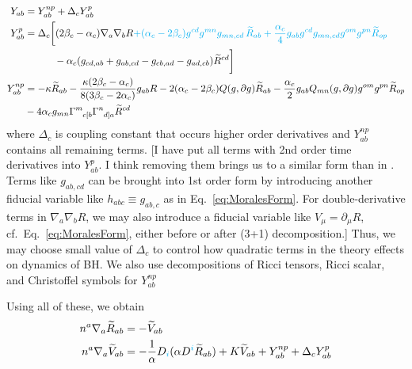 \documentclass[a4paper,oneside,openany,11pt]{memoir}
\numberwithin{equation}{section} %
\newcommand{\aaron}[1]{{\color{cyan} #1}}
\newcommand{\TODO}[1]{{\color{red}[}{\color{red}TODO:} {\color{blue}#1}{\color{red}]}}
\begin{document}
\begin{align}
Y_{ab} &= Y^{np}_{ab} + \Delta_c Y^{p}_{ab}
\\\notag
Y^{p}_{ab} &= \Delta_c \bigg[
	(2 \beta_c - \alpha_c) \nabla_a \nabla_b R
	\aaron{
	+ (\alpha_c - 2 \beta_c)g^{cd}g^{mn} g_{mn,cd}\,\widetilde{R}_{ab}
	+\frac{\alpha_c}{4} g_{ab} g^{cd}g_{mn,cd} g^{om}g^{pn} \widetilde{R}_{op}
	}
	\\\notag
	&\quad\quad\quad
	- \alpha_c (g_{cd,ab} + g_{ab,cd} - g_{cb,ad} - g_{ad,cb}) \widetilde{R}^{cd} 
	\bigg]
\\\notag
Y^{np}_{ab} &= 
- \kappa \widetilde{R}_{ab} - \frac{\kappa(2 \beta_c - \alpha_c)}{8(3\beta_c - 2 \alpha_c)} g_{ab} R
-2(\alpha_c - 2 \beta_c)Q(g,\partial g)\widetilde{R}_{ab}
-\frac{\alpha_c}{2} g_{ab} Q_{mn} (g,\partial g) g^{om}g^{pn} \widetilde{R}_{op}
\\\notag
&- 4\alpha_c g_{mn} \Gamma\indices{^m_{c[b}} \Gamma\indices{^n_{d]a}} \widetilde{R}^{cd}
\end{align}
where $\Delta_c$ is coupling constant that occurs higher order derivatives and $Y^{np}_{ab}$ contains all remaining terms.
\aaron{[I have put all terms with 2nd order time derivatives into $Y^{p}_{ab}$. I think removing them brings us to a similar form than in \cite{Morales:2018imi}. Terms like $g_{ab,cd}$ can be brought into 1st order form by introducing another fiducial variable like $h_{abc} \equiv g_{ab,c}$ as in Eq.~\eqref{eq:MoralesForm}. For double-derivative terms in $\nabla_a \nabla_b R$, we may also introduce a fiducial variable like $V_\mu = \partial_\mu R$, cf.~Eq.~\eqref{eq:MoralesForm}, either before or after (3+1) decomposition.]}
Thus, we may choose small value of $\Delta_c$ to control how quadratic terms in the theory effects on dynamics of BH.
We also use decompositions of Ricci tensors, Ricci scalar, and Christoffel symbols for $Y^{np}_{ab}$ %

Using all of these, we obtain
\begin{align}
n^a \nabla_a \widetilde{R}_{ab} &= - \widetilde{V}_{ab}  \\
n^a \nabla_a \widetilde{V}_{ab} &= -  \frac{1}{\alpha} D_\aaron{i}(\alpha D^\aaron{i} \widetilde{R}_{ab} ) + K \widetilde{V}_{ab} + Y^{np}_{ab} + \Delta_c Y^{p}_{ab}
\end{align} 
\end{document}
